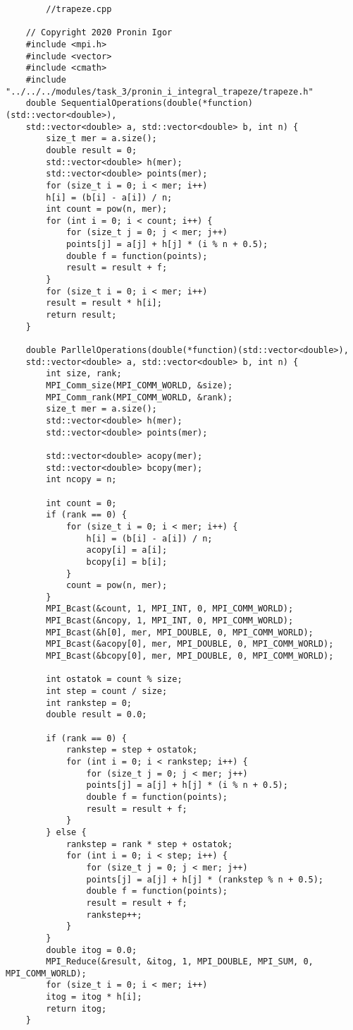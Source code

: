 \documentclass{report}
\begin{document}
	\begin{lstlisting}
		//trapeze.cpp
		
	// Copyright 2020 Pronin Igor
	#include <mpi.h>
	#include <vector>
	#include <cmath>
	#include "../../../modules/task_3/pronin_i_integral_trapeze/trapeze.h"
	double SequentialOperations(double(*function)(std::vector<double>),
	std::vector<double> a, std::vector<double> b, int n) {
		size_t mer = a.size();
		double result = 0;
		std::vector<double> h(mer);
		std::vector<double> points(mer);
		for (size_t i = 0; i < mer; i++)
		h[i] = (b[i] - a[i]) / n;
		int count = pow(n, mer);
		for (int i = 0; i < count; i++) {
			for (size_t j = 0; j < mer; j++)
			points[j] = a[j] + h[j] * (i % n + 0.5);
			double f = function(points);
			result = result + f;
		}
		for (size_t i = 0; i < mer; i++)
		result = result * h[i];
		return result;
	}
	
	double ParllelOperations(double(*function)(std::vector<double>),
	std::vector<double> a, std::vector<double> b, int n) {
		int size, rank;
		MPI_Comm_size(MPI_COMM_WORLD, &size);
		MPI_Comm_rank(MPI_COMM_WORLD, &rank);
		size_t mer = a.size();
		std::vector<double> h(mer);
		std::vector<double> points(mer);
		
		std::vector<double> acopy(mer);
		std::vector<double> bcopy(mer);
		int ncopy = n;
		
		int count = 0;
		if (rank == 0) {
			for (size_t i = 0; i < mer; i++) {
				h[i] = (b[i] - a[i]) / n;
				acopy[i] = a[i];
				bcopy[i] = b[i];
			}
			count = pow(n, mer);
		}
		MPI_Bcast(&count, 1, MPI_INT, 0, MPI_COMM_WORLD);
		MPI_Bcast(&ncopy, 1, MPI_INT, 0, MPI_COMM_WORLD);
		MPI_Bcast(&h[0], mer, MPI_DOUBLE, 0, MPI_COMM_WORLD);
		MPI_Bcast(&acopy[0], mer, MPI_DOUBLE, 0, MPI_COMM_WORLD);
		MPI_Bcast(&bcopy[0], mer, MPI_DOUBLE, 0, MPI_COMM_WORLD);
		
		int ostatok = count % size;
		int step = count / size;
		int rankstep = 0;
		double result = 0.0;
		
		if (rank == 0) {
			rankstep = step + ostatok;
			for (int i = 0; i < rankstep; i++) {
				for (size_t j = 0; j < mer; j++)
				points[j] = a[j] + h[j] * (i % n + 0.5);
				double f = function(points);
				result = result + f;
			}
		} else {
			rankstep = rank * step + ostatok;
			for (int i = 0; i < step; i++) {
				for (size_t j = 0; j < mer; j++)
				points[j] = a[j] + h[j] * (rankstep % n + 0.5);
				double f = function(points);
				result = result + f;
				rankstep++;
			}
		}
		double itog = 0.0;
		MPI_Reduce(&result, &itog, 1, MPI_DOUBLE, MPI_SUM, 0, MPI_COMM_WORLD);
		for (size_t i = 0; i < mer; i++)
		itog = itog * h[i];
		return itog;
	}
	\end{lstlisting}
\end{document}
